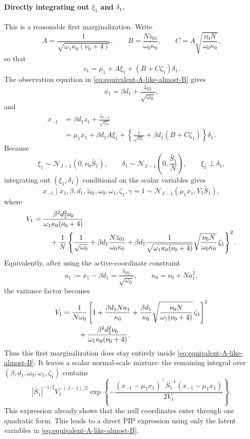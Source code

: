 \documentclass[11pt]{article}
\newcommand{\Normal}{\mathcal N}
\begin{document}
\paragraph{Directly integrating out $\xi_1$ and $\delta_1$.}
This is a reasonable first marginalization. Write
\[
A=\frac{1}{\sqrt{\omega_1\kappa_0(\nu_0+4)}},
\qquad
B=\frac{N\bar z_{01}}{\omega_0\kappa_0},
\qquad
C=A\sqrt{\frac{\nu_0 N}{\omega_0\kappa_0}},
\]
so that
\[
z_1=\mu_1+A\xi_1+(B+C\zeta_1)\delta_1.
\]
The observation equation in \eqref{eq:equivalent-A-like-almost-B} gives
\[
x_1=\beta d_1+\frac{\bar z_{01}}{\sqrt{\omega_0}},
\]
and
\begin{align*}
x_{-1}
&=
\beta d_1 z_1+\frac{\bar z_{0,-1}}{\sqrt{\omega_0}}\\
&=
\mu_1x_1
+\beta d_1 A\xi_1
+\left\{
\frac1{\sqrt{\omega_0}}+\beta d_1(B+C\zeta_1)
\right\}\delta_1.
\end{align*}
Because
\[
\xi_1\sim\Normal_{J-1}(0,\nu_0\bar S_1),
\qquad
\delta_1\sim\Normal_{J-1}\left(0,\frac{\bar S_1}{N}\right),
\qquad
\xi_1\perp\delta_1,
\]
integrating out $(\xi_1,\delta_1)$ conditional on the scalar variables gives
\begin{equation}\label{eq:direct-xminus-after-xi-delta}
x_{-1}\mid x_1,\beta,d_1,\bar z_{01},\omega_0,\omega_1,\zeta_1,\gamma=1
\sim
\Normal_{J-1}\left(
\mu_1x_1,
V_1\bar S_1
\right),
\end{equation}
where
\begin{align}
V_1
=\;&
\frac{\beta^2d_1^2\nu_0}
{\omega_1\kappa_0(\nu_0+4)}
\notag\\
&\quad+
\frac1N
\left\{
\frac1{\sqrt{\omega_0}}
+\beta d_1\frac{N\bar z_{01}}{\omega_0\kappa_0}
+\beta d_1
\frac{1}{\sqrt{\omega_1\kappa_0(\nu_0+4)}}
\sqrt{\frac{\nu_0 N}{\omega_0\kappa_0}}\,
\zeta_1
\right\}^2 .
\label{eq:direct-V1-before-x1-substitution}
\end{align}
Equivalently, after using the active-coordinate constraint
\[
a_1:=x_1-\beta d_1=\frac{\bar z_{01}}{\sqrt{\omega_0}},
\qquad
\kappa_0=\nu_0+Na_1^2,
\]
the variance factor becomes
\begin{align}
V_1
=\;&
\frac{1}{N\omega_0}
\left[
1+\frac{\beta d_1Na_1}{\kappa_0}
+\frac{\beta d_1}{\kappa_0}
\sqrt{\frac{\nu_0 N}{\omega_1(\nu_0+4)}}\,\zeta_1
\right]^2
\notag\\
&\quad+
\frac{\beta^2d_1^2\nu_0}
{\omega_1\kappa_0(\nu_0+4)}.
\label{eq:direct-V1-after-x1-substitution}
\end{align}
Thus this first marginalization does stay entirely inside
\eqref{eq:equivalent-A-like-almost-B}. It leaves a scalar normal-scale mixture:
the remaining integral over
$(\beta,d_1,\omega_0,\omega_1,\zeta_1)$ contains
\[
|\bar S_1|^{-1/2}
V_1^{-(J-1)/2}
\exp\left\{
-\frac{
(x_{-1}-\mu_1x_1)^\top\bar S_1^{-1}(x_{-1}-\mu_1x_1)
}{2V_1}
\right\}.
\]
This expression already shows that the null coordinates enter through one
quadratic form. This leads to a direct PIP expression using only the latent
variables in \eqref{eq:equivalent-A-like-almost-B}.
\end{document}
